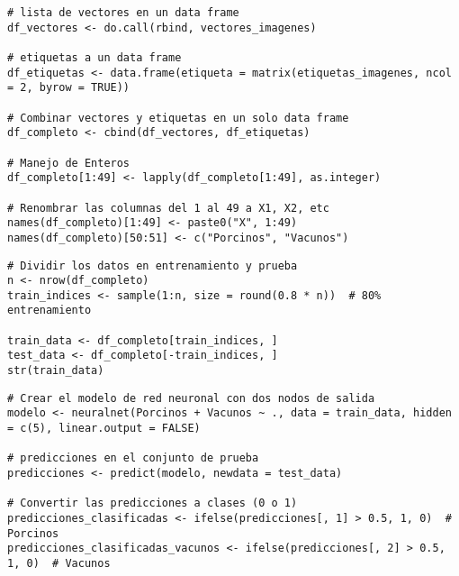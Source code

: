\documentclass[12pt]{article}
\begin{document}

\begin{lstlisting}[caption={Manejo de vectores y etiquetas en un data frame}, label={lst:dataframe_vectores_etiquetas}]
# lista de vectores en un data frame
df_vectores <- do.call(rbind, vectores_imagenes)

# etiquetas a un data frame
df_etiquetas <- data.frame(etiqueta = matrix(etiquetas_imagenes, ncol = 2, byrow = TRUE))

# Combinar vectores y etiquetas en un solo data frame
df_completo <- cbind(df_vectores, df_etiquetas)

# Manejo de Enteros
df_completo[1:49] <- lapply(df_completo[1:49], as.integer)

# Renombrar las columnas del 1 al 49 a X1, X2, etc
names(df_completo)[1:49] <- paste0("X", 1:49)
names(df_completo)[50:51] <- c("Porcinos", "Vacunos")
\end{lstlisting}
\newpage


\begin{lstlisting}[caption={División de los datos en conjuntos de entrenamiento y prueba}, label={lst:division_datos}]
# Dividir los datos en entrenamiento y prueba
n <- nrow(df_completo)
train_indices <- sample(1:n, size = round(0.8 * n))  # 80% entrenamiento

train_data <- df_completo[train_indices, ]
test_data <- df_completo[-train_indices, ]
str(train_data)
\end{lstlisting}


\begin{lstlisting}[caption={Creación del modelo de red neuronal y predicciones}, label={lst:modelo_red_neuronal}]
# Crear el modelo de red neuronal con dos nodos de salida
modelo <- neuralnet(Porcinos + Vacunos ~ ., data = train_data, hidden = c(5), linear.output = FALSE)

# predicciones en el conjunto de prueba
predicciones <- predict(modelo, newdata = test_data)

# Convertir las predicciones a clases (0 o 1)
predicciones_clasificadas <- ifelse(predicciones[, 1] > 0.5, 1, 0)  # Porcinos
predicciones_clasificadas_vacunos <- ifelse(predicciones[, 2] > 0.5, 1, 0)  # Vacunos
\end{lstlisting}
\end{document}
